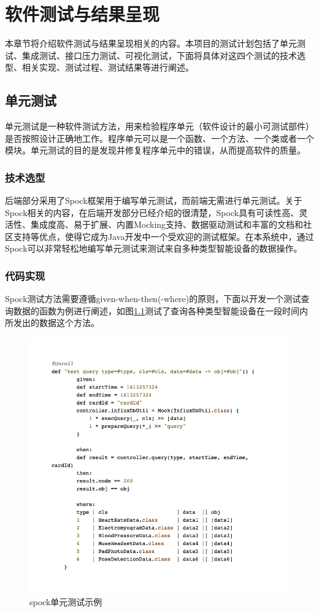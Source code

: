 \documentclass[oneside]{xduugthesis}
\begin{document}
\let\cleardoublepage\clearpage
\chapter{软件测试与结果呈现}

本章节将介绍软件测试与结果呈现相关的内容。本项目的测试计划包括了单元测试、集成测试、接口压力测试、可视化测试，下面将具体对这四个测试的技术选型、相关实现、测试过程、测试结果等进行阐述。

\section{单元测试}

单元测试是一种软件测试方法，用来检验程序单元（软件设计的最小可测试部件）是否按照设计正确地工作。程序单元可以是一个函数、一个方法、一个类或者一个模块。单元测试的目的是发现并修复程序单元中的错误，从而提高软件的质量。

\subsection{技术选型}

后端部分采用了Spock框架用于编写单元测试，而前端无需进行单元测试。关于Spock相关的内容，在后端开发部分已经介绍的很清楚，Spock具有可读性高、灵活性、集成度高、易于扩展、内置Mocking支持、数据驱动测试和丰富的文档和社区支持等优点，使得它成为Java开发中一个受欢迎的测试框架。在本系统中，通过Spock可以非常轻松地编写单元测试来测试来自多种类型智能设备的数据操作。

\subsection{代码实现}

Spock测试方法需要遵循given-when-then(-where)的原则，下面以开发一个测试查询数据的函数为例进行阐述，如图\ref{fig:spock}测试了查询各种类型智能设备在一段时间内所发出的数据这个方法。

\begin{figure}[htb]
    \centering
    \includegraphics[width=0.8\linewidth]{images/code-spock.jpeg}
    \caption{spock单元测试示例}
    \label{fig:spock}
\end{figure}
\end{document}
